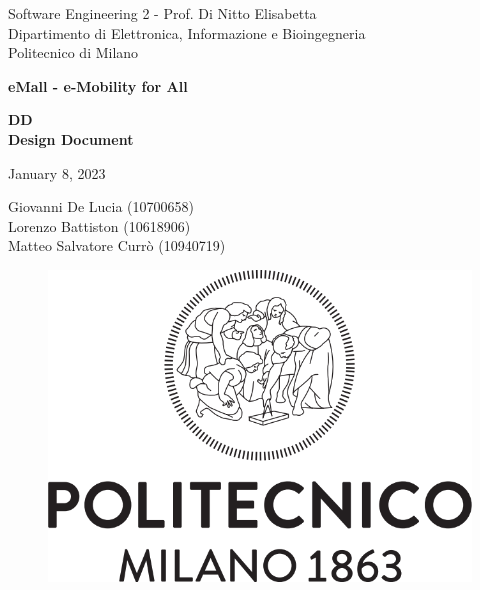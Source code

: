 \documentclass{article}
\begin{document}
\begin{titlepage}
  \centering
  {\normalsize
    Software Engineering 2 - Prof. Di Nitto Elisabetta \\
    Dipartimento di Elettronica, Informazione e Bioingegneria \\
    Politecnico di Milano \par
  }     \vspace{3cm}
  {\Huge \textbf{eMall - e-Mobility for All\\} } \vspace{1cm}
  {\large \textbf{DD\\Design Document} \par} \vspace{1cm}
  {\normalsize January 8, 2023 \par} \vspace{4cm}
  {\normalsize Giovanni De Lucia (10700658) \\ Lorenzo Battiston (10618906) \\  Matteo Salvatore Currò (10940719)\par} \vspace{4cm}
  \begin{figure}[h]
    \centering
    \includegraphics[scale=0.3]{src/Logo_Politecnico_Milano.png}
  \end{figure} \vspace{0.5cm}
\end{titlepage}

\tableofcontents








\end{document}
